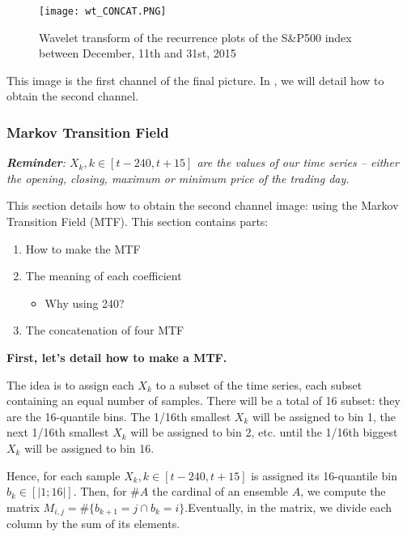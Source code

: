 \documentclass[11pt]{article}
\begin{document}
\begin{onehalfspace}
\begin{figure}[h!]
     \centering
     \captionsetup{justification=centering}
     \texttt{[image: wt\_CONCAT.PNG]}
     \caption{Wavelet transform of the recurrence plots of the S\&P500 index between December, 11th and 31st, 2015}
\label{fig:wt}
\end{figure}

This image is the first channel of the final picture. In , we will detail how to obtain the second channel.

\subsubsection{Markov Transition Field}
\label{sec:mtf}

\textit{\textbf{Reminder}: $X_k, k \in [t - 240, t+15]$ are the values of our time series -- either the opening, closing, maximum or minimum price of the trading day.}

This section details how to obtain the second channel image: using the Markov Transition Field (MTF). This section contains parts:

\begin{enumerate}
    \item How to make the MTF
    \item The meaning of each coefficient
    \begin{itemize}
        \item Why using 240?
    \end{itemize}
    \item The concatenation of four MTF
\end{enumerate}

\noindent \textbf{First, let's detail how to make a MTF.}

The idea is to assign each $X_k$ to a subset of the time series, each subset containing an equal number of samples. There will be a total of 16 subset: they are the 16-quantile bins. The 1/16th smallest $X_k$ will be assigned to bin 1, the next 1/16th smallest $X_k$ will be assigned to bin 2, etc. until the 1/16th biggest $X_k$ will be assigned to bin 16. 

Hence, for each sample $X_k, k \in [t - 240, t+15]$ is assigned its 16-quantile bin $b_k \in [|1;16|]$. Then, for $\#A$ the cardinal of an ensemble $A$, we compute the matrix $M_{i,j} = \# \{b_{k+1} = j \cap b_k = i \}$.Eventually, in the matrix, we divide each column by the sum of its elements.


\end{onehalfspace}
\end{document}
